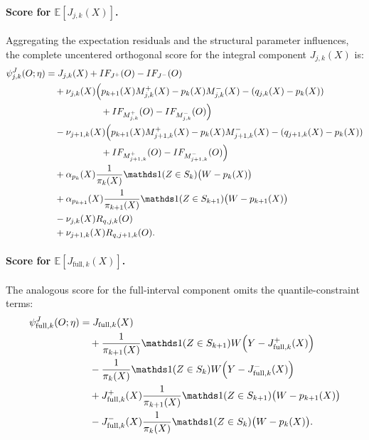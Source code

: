 \paragraph{Score for $\mathbb E[J_{j,k}(X)]$.} Aggregating the expectation residuals and the structural parameter influences, the complete uncentered orthogonal score for the integral component $J_{j,k}(X)$ is:
\begin{align*}
    \psi_{j,k}^J(O; \eta) &= J_{j,k}(X) + IF_{J^+}(O) - IF_{J^-}(O) \\
    &\quad + \nu_{j,k}(X) \Big( p_{k+1}(X)M_{j,k}^+(X) - p_k(X)M_{j,k}^-(X) - (q_{j,k}(X) - p_k(X)) \\
    &\quad \quad \quad \quad \quad \quad + IF_{M_{j,k}^+}(O) - IF_{M_{j,k}^-}(O) \Big) \\
    &\quad - \nu_{j+1,k}(X) \Big( p_{k+1}(X)M_{j+1,k}^+(X) - p_k(X)M_{j+1,k}^-(X) - (q_{j+1,k}(X) - p_k(X)) \\
    &\quad \quad \quad \quad \quad \quad + IF_{M_{j+1,k}^+}(O) - IF_{M_{j+1,k}^-}(O) \Big) \\
    &\quad + \alpha_{p_k}(X) \frac{1}{\pi_k(X)} \indicator(Z \in S_k) \big(W - p_k(X)\big) \\
    &\quad + \alpha_{p_{k+1}}(X) \frac{1}{\pi_{k+1}(X)} \indicator(Z \in S_{k+1}) \big(W - p_{k+1}(X)\big) \\
    &\quad - \nu_{j,k}(X) R_{q,j,k}(O) \\
    &\quad + \nu_{j+1,k}(X) R_{q,j+1,k}(O).
\end{align*}

\paragraph{Score for $\mathbb E[J_{\mathrm{full},k}(X)]$.} The analogous score for the full-interval component omits the quantile-constraint terms:
\begin{align*}
    \psi_{\text{full},k}^J(O; \eta) &= J_{\text{full},k}(X) \\
    &\quad + \frac{1}{\pi_{k+1}(X)} \indicator(Z \in S_{k+1}) W \Big( Y - J_{\text{full},k}^+(X) \Big) \\
    &\quad - \frac{1}{\pi_k(X)} \indicator(Z \in S_k) W \Big( Y - J_{\text{full},k}^-(X) \Big) \\
    &\quad + J_{\text{full},k}^+(X) \frac{1}{\pi_{k+1}(X)} \indicator(Z \in S_{k+1}) \big(W - p_{k+1}(X)\big) \\
    &\quad - J_{\text{full},k}^-(X) \frac{1}{\pi_k(X)} \indicator(Z \in S_k) \big(W - p_k(X)\big).
\end{align*}

